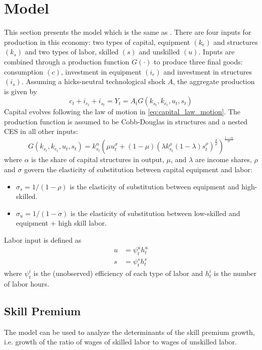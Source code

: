 \documentclass[12pt]{article}
\begin{document}
\section{Model}\label{sec:model}
This section presents the model which is the same as \citep{krusell2000capital}. There are four inputs for production in this economy: two types of capital, equipment $(k_e)$ and structures $(k_s)$ and two types of labor, skilled $(s)$ and unskilled $(u)$. Inputs are combined through a production function $G(\cdot)$ to produce three final goods: consumption $(c)$, investment in equipment $(i_e)$ and investment in structures $(i_s)$. Assuming a hicks-neutral technological shock $A$, the aggregate production is given by
\begin{equation}\label{eq:production}
 c_t + i_{e_t} + i_{s_t} = Y_t = A_t G(k_{s_t}, k_{e_t}, u_t, s_t)
\end{equation}
Capital evolves following the law of motion in \eqref{eq:capital_law_motion}. The production function is assumed to be Cobb-Douglas in structures and a nested CES in all other inputs:
\begin{equation}\label{eq:production_fun}
 G(k_{s_t}, k_{e_t}, u_t, s_t) = k_{s_t}^\alpha\left( \mu u_t^\sigma + (1-\mu)\left(\lambda k_{s_t}^\rho (1-\lambda)s_t^\rho\right)^\frac{\sigma}{\rho}\right)^\frac{1-\alpha}{\sigma}
\end{equation}
where $\alpha$ is the share of capital structures in output, $\mu$, and $\lambda$ are income shares, $\rho$ and $\sigma$ govern the elasticity of substitution between capital equipment and labor:
\begin{itemize}
 \item $\sigma_s = 1/(1-\rho)$ is the elasticity of substitution between equipment and high-skilled.
 \item $\sigma_u = 1/(1-\sigma)$ is the elasticity of substitution between low-skilled and equipment + high skill labor.
\end{itemize}
Labor input is defined as 
\begin{align*}
    u &= \psi^u_t h^u_t\\
    s &= \psi^s_t h^s_t
\end{align*}
where $\psi^i_t$ is the (unobserved) efficiency of each type of labor and $h^i_t$ is the number of labor hours. 

\subsection{Skill Premium}
The model can be used to analyze the determinants of the skill premium growth, i.e. growth of the ratio of wages of skilled labor to wages of unskilled labor. 
\end{document}
